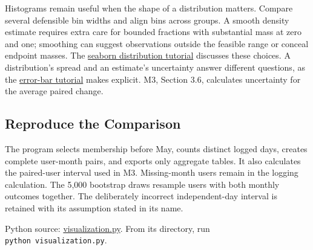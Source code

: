 Histograms remain useful when the shape of a distribution matters.
Compare several defensible bin widths and align bins across groups. A
smooth density estimate requires extra care for bounded fractions with
substantial mass at zero and one; smoothing can suggest observations
outside the feasible range or conceal endpoint masses. The
\href{https://seaborn.pydata.org/tutorial/distributions.html}{seaborn
distribution tutorial} discusses these choices. A distribution's spread
and an estimate's uncertainty answer different questions, as the
\href{https://seaborn.pydata.org/tutorial/error_bars.html}{error-bar
tutorial} makes explicit. M3, Section 3.6, calculates uncertainty for
the average paired change.

\hypertarget{M02-reproduce-the-comparison}{%
\subsection{Reproduce the
Comparison}\label{M02-reproduce-the-comparison}}

\noindent The program selects membership before May, counts distinct logged days,
creates complete user-month pairs, and exports only aggregate tables. It
also calculates the paired-user interval used in M3. Missing-month users
remain in the logging calculation. The 5,000 bootstrap draws resample
users with both monthly outcomes together. The deliberately incorrect
independent-day interval is retained with its assumption stated in its
name.

\FloatBarrier
{}
Python source:
\href{../03_Data_and_Code/mHealth/recurring_examples/visualization.py}{visualization.py}.
From its directory, run \texttt{python\ visualization.py}.

